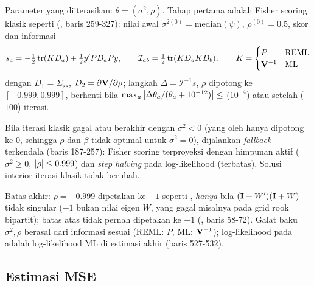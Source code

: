 Parameter yang diiterasikan: $\theta=(\sigma^2,\rho)$. Tahap pertama adalah
Fisher scoring klasik seperti  (,
baris 259-327): nilai awal $\sigma^{2(0)}=\mathrm{median}(\psi)$,
$\rho^{(0)}=0.5$, skor dan informasi
\begin{equation}
  s_a=-\tfrac12\operatorname{tr}(K D_a)+\tfrac12 y'P D_a P y,
  \qquad
  \mathcal I_{ab}=\tfrac12\operatorname{tr}(K D_a K D_b),
  \qquad K=\begin{cases}P&\text{REML}\\ \mathbf{V}^{-1}&\text{ML}\end{cases}
  \label{eq:sfh-score-reml}
\end{equation}
dengan $D_1=\Sigma_{ss}$, $D_2=\partial\mathbf{V}/\partial\rho$; langkah
$\Delta=\mathcal I^{-1}s$, $\rho$ dipotong ke $[-0.999,0.999]$, berhenti bila
$\max_a\left|\Delta\theta_a/(\theta_a+10^{-12})\right|\le$ 
($10^{-4}$) atau setelah  ($100$) iterasi.

Bila iterasi klasik gagal atau berakhir dengan $\sigma^2<0$ (yang oleh
 hanya dipotong ke $0$, sehingga $\rho$ dan $\beta$ tidak optimal
untuk $\sigma^2=0$), dijalankan \emph{fallback} terkendala
 (baris 187-257): Fisher scoring terproyeksi
dengan himpunan aktif ($\sigma^2\ge0$, $\left|\rho\right|\le0.999$) dan \emph{step
halving} pada log-likelihood (terbatas). Solusi interior iterasi klasik tidak
berubah.

Batas akhir: $\rho=-0.999$ dipetakan ke $-1$ seperti , \emph{hanya}
bila $(\mathbf{I}+W')(\mathbf{I}+W)$ tidak singular ($-1$ bukan nilai eigen $W$, yang
gagal misalnya pada grid rook bipartit); batas atas tidak pernah dipetakan ke
$+1$ (, baris 58-72). Galat baku $\sigma^2,\rho$ berasal
dari informasi sesuai  (REML: $P$, ML: $\mathbf{V}^{-1}$); log-likelihood
pada  adalah log-likelihood ML di estimasi akhir
(baris 527-532).

\subsection{Estimasi MSE}\label{sec:sfh-mse}

